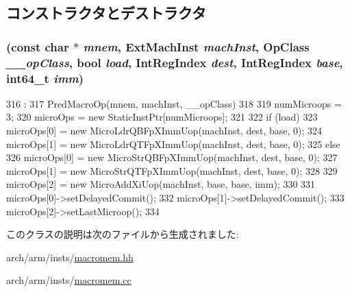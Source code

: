 \subsection{コンストラクタとデストラクタ}
\hypertarget{classArmISA_1_1BigFpMemPostOp_a9e2ec00bc8cb99dc7aeee6ec6f5e8148}{
\subsubsection[{BigFpMemPostOp}]{ (const char $\ast$ {\em mnem}, \/  {\bf ExtMachInst} {\em machInst}, \/  OpClass {\em \_\-\_\-opClass}, \/  bool {\em load}, \/  {\bf IntRegIndex} {\em dest}, \/  {\bf IntRegIndex} {\em base}, \/  int64\_\-t {\em imm})}}
\label{classArmISA_1_1BigFpMemPostOp_a9e2ec00bc8cb99dc7aeee6ec6f5e8148}



\begin{DoxyCode}
316                                                               :
317     PredMacroOp(mnem, machInst, __opClass)
318 {
319     numMicroops = 3;
320     microOps = new StaticInstPtr[numMicroops];
321 
322     if (load) {
323         microOps[0] = new MicroLdrQBFpXImmUop(machInst, dest, base, 0);
324         microOps[1] = new MicroLdrQTFpXImmUop(machInst, dest, base, 0);
325     } else {
326         microOps[0] = new MicroStrQBFpXImmUop(machInst, dest, base, 0);
327         microOps[1] = new MicroStrQTFpXImmUop(machInst, dest, base, 0);
328     }
329     microOps[2] = new MicroAddXiUop(machInst, base, base, imm);
330 
331     microOps[0]->setDelayedCommit();
332     microOps[1]->setDelayedCommit();
333     microOps[2]->setLastMicroop();
334 }

\end{DoxyCode}


このクラスの説明は次のファイルから生成されました:\begin{DoxyCompactItemize}
\item 
arch/arm/insts/\hyperlink{macromem_8hh}{macromem.hh}\item 
arch/arm/insts/\hyperlink{macromem_8cc}{macromem.cc}\end{DoxyCompactItemize}
